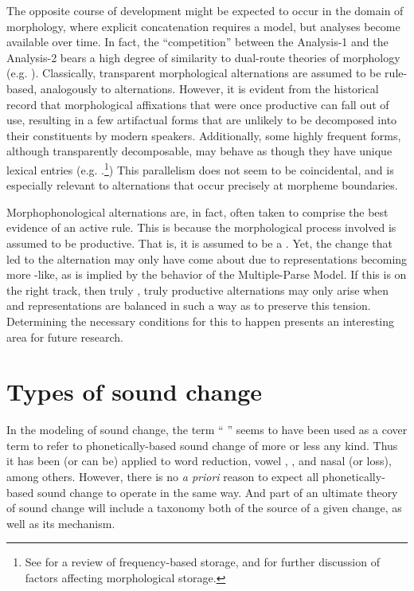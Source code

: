 The opposite course of development might be expected to occur in the
domain of morphology, where explicit concatenation requires a 
model, but  analyses become available over time. In fact,
the “competition” between the Analysis-1  and the Analysis-2  bears a high degree of similarity to dual-route theories of
morphology (e.g. \citealt{caramazza1988lexical,frauenfelder1992constraining}).
Classically, transparent morphological alternations are assumed to
be rule-based, analogously to  alternations. However, it
is evident from the historical record that morphological affixations
that were once productive can fall out of use, resulting in a few
artifactual forms that are unlikely to be decomposed into their constituents
by modern speakers. Additionally, some highly frequent forms, although
transparently decomposable, may behave as though they have unique
lexical entries (e.g. \citealt{baayen1997singulars}.\footnote{See \citealt{levelt1999theory}
for a review of frequency-based storage, and \citealt{burani1987representation,baayen1993frequency}
for further discussion of factors affecting morphological storage.})
This parallelism does not seem to be coincidental, and is especially
relevant to  alternations that occur precisely at morpheme
boundaries.

Morphophonological alternations are, in fact, often taken to comprise
the best evidence of an active  rule. This is because
the morphological process involved is assumed to be productive. That
is, it is assumed to be a . Yet, the change that led
to the  alternation may only have come about due to representations
becoming more -like, as is implied by the behavior of
the Multiple-Parse Model. If this is on the right track, then truly
, truly productive alternations may only arise when 
and  representations are balanced in such a way as to
preserve this tension. Determining the necessary conditions for this
to happen presents an interesting area for future research.

\section{Types of sound change}

In the modeling of sound change, the term “ ” seems
to have been used as a cover term to refer to phonetically-based sound
change of more or less any kind. Thus it has been (or can be) applied
to word reduction, vowel , , and nasal
 (or loss), among others. However, there is no \emph{a priori}
reason to expect all phonetically-based sound change to operate in
the same way. And part of an ultimate theory of sound change
will include a taxonomy both of the source of a given change, as well
as its  mechanism. 

